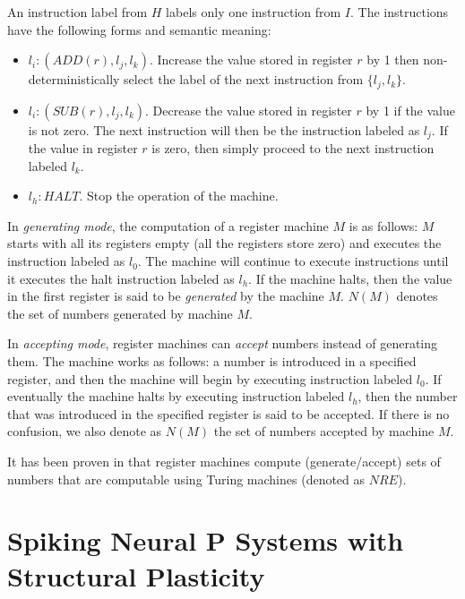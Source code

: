 \documentclass[smallextended]{svjour3}
\begin{document}
An instruction label from $H$ labels only one instruction from $I$. The instructions have the following forms and semantic meaning:

\begin{itemize}
   \item $l_i: (ADD(r),l_j,l_k)$. Increase the value stored in register $r$ by 1 then non-deterministically select the label of the next instruction
         from $\{l_j,l_k\}$.         
   \item $l_i: (SUB(r),l_j,l_k)$. Decrease the value stored in register $r$ by 1 if the value is not zero. The next instruction will then be the 
         instruction labeled as $l_j$. If the value in register $r$ is zero, then simply proceed to the next instruction labeled $l_k$.
   \item $l_h: HALT$. Stop the operation of the machine.
\end{itemize}
  
In \textit{generating mode}, the computation of a register machine $M$ is as follows: $M$ starts with all its registers empty (all the registers store
zero) and executes the instruction labeled as $l_0$. The machine will continue to execute instructions until it executes the halt instruction labeled
as $l_h$. If the machine halts, then the value in the first register is said to be \textit{generated} by the machine $M$. $N(M)$ denotes the set of 
numbers generated by machine $M$. 
  
In \textit{accepting mode}, register machines can \textit{accept} numbers instead of generating them. The machine works as follows: a number is 
introduced in a specified register, and then the machine will begin by executing instruction labeled $l_0$. If eventually the machine halts by 
executing instruction labeled $l_h$, then the number that was introduced in the specified register is said to be accepted. If there is no confusion, 
we also denote as $N(M)$ the set of numbers accepted by machine $M$.

It has been proven in \cite{MINSKY} that register machines compute (generate/accept) sets of numbers that are computable using Turing machines
(denoted as $NRE$). 
  

\section{Spiking Neural P Systems with Structural Plasticity}\label{sec-snpsp}
\end{document}
